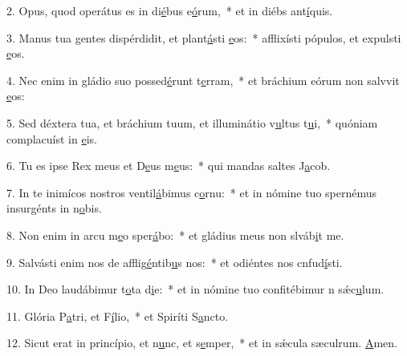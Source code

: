 2. Opus, quod operátus es in di\uline{é}bus e\uline{ó}rum,~* et in diébs ant\uline{í}quis.\par 
3. Manus tua gentes dispérdidit, et plant\uline{á}sti \uline{e}os:~* afflixísti pópulos, et expulsti \uline{e}os.\par 
4. Nec enim in gládio suo possed\uline{é}runt t\uline{e}rram,~* et bráchium eórum non salvvit \uline{e}os:\par 
5. Sed déxtera tua, et bráchium tuum, et illuminátio v\uline{u}ltus t\uline{u}i,~* quóniam complacuíst in \uline{e}is.\par 
6. Tu es ipse Rex meus et D\uline{e}us m\uline{e}us:~* qui mandas saltes J\uline{a}cob.\par 
7. In te inimícos nostros ventil\uline{á}bimus c\uline{o}rnu:~* et in nómine tuo spernémus insurgénts in n\uline{o}bis.\par 
8. Non enim in arcu m\uline{e}o sper\uline{á}bo:~* et gládius meus non slváb\uline{i}t me.\par 
9. Salvásti enim nos de afflig\uline{é}ntib\uline{u}s nos:~* et odiéntes nos cnfud\uline{í}sti.\par 
10. In Deo laudábimur t\uline{o}ta d\uline{i}e:~* et in nómine tuo confitébimur n sǽc\uline{u}lum.\par 
11. Glória P\uline{a}tri, et F\uline{í}lio,~* et Spiríti S\uline{a}ncto.\par 
12. Sicut erat in princípio, et n\uline{u}nc, et s\uline{e}mper,~* et in sǽcula sæculrum. \uline{A}men.\par 
